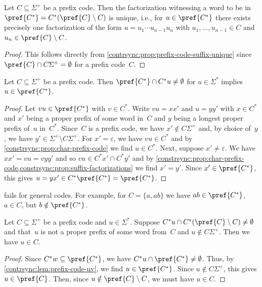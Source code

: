 \begin{corollary}
	Let $C \subseteq \Sigma^+$ be a prefix code.
	Then the factorization witnessing a word to
	be in $\pref{C^*} = C^*( \pref{C} \setminus C )$
	is unique, i.e., 
	for $u \in \pref{C^*}$
	there exists precisely one factorization
	of the form $u = u_1 \cdots u_{n-1} u_n$
	with $u_1, \ldots, u_{n-1} \in C$
	and $u_n \in \pref{C}\setminus C$.	
\end{corollary}
\begin{proof}
	This follows directly from \cref{contrsync:prop:prefix-code-suffix-unique}
	since $\pref{C} \cap C\Sigma^+ = \emptyset$ for a prefix code~$C$.
\end{proof}





\begin{corollary} \label{contrsync:lem:prefix-code-uv}
	Let $C \subseteq \Sigma^+$ be a prefix code.
	Then $\pref{C^*} \cap C^*u \ne \emptyset$ for $u \in \Sigma^*$
	implies $u \in \pref{C^*}$.	
\end{corollary}
\begin{proof}
	Let $vu \in \pref{C^*}$ with $v \in C^*$.	
	Write $vu = xx'$ and $u = yy'$ with $x \in C^*$ and $x'$ being a proper prefix of some word in~$C$
	and $y$ being a longest proper prefix of~$u$ in~$C^*$.
	Since~$C$ is a prefix code, we have $x' \notin C\Sigma^+$
	and, by choice of~$y$, we have $y' \in \Sigma^+ \setminus C\Sigma^+$.
	For $x' = \varepsilon$, we have $vu \in C^*$
	and by \cref{constrsync:prop:char-prefix-code} we find $u \in C^*$.
	Next, suppose $x' \ne \varepsilon$.
	We have $xx' = vu = vyy'$ and so $vu \in C^*x' \cap C^*y'$
	and by \cref{constrsync:prop:char-prefix-code,constrsync:prop:suffix-factorizations} we find $x' = y'$.
	Since $x' \in \pref{C^*}$,
	this gives $u = yx' \in C^*\pref{C^*} = \pref{C^*}$.	
\end{proof}

 fails for general codes. For example, for $C = \{a,ab\}$
we have $ab \in \pref{C^*}$, $a \in C$, but $b \notin \pref{C^*}$.

\begin{corollary}
	Let $C \subseteq \Sigma^+$ be a prefix code and $u \in \Sigma^*$.
	Suppose $C^*u \cap C^* ( \pref{C} \setminus C ) \ne \emptyset$
	and that~$u$ is not a proper prefix of some word from~$C$ and $u \notin C\Sigma^+$.
	Then we have $u \in C$.
\end{corollary}
\begin{proof}
	Since $C^*w \subseteq \pref{C^*}$,
	we have $C^* u \cap \pref{C^*} \ne \emptyset$.
	Thus, by \cref{contrsync:lem:prefix-code-uv}, 
	we find $u\in \pref{C^*}$.
	Since $u \notin C\Sigma^+$, this gives $u \in \pref{C}$.
	Then, since $u \notin \pref{C}\setminus C$,
	we must have $u \in C$.
\end{proof}

